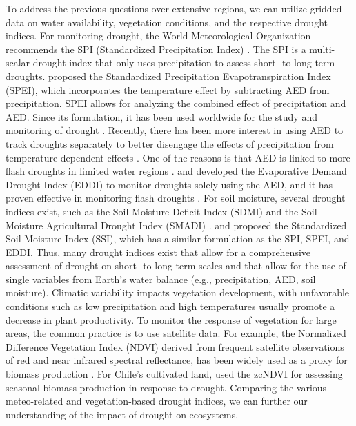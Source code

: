 \documentclass[
  authoryear,
  preprint,
  3p,
  onecolumn]{elsarticle}
\begin{document}
To address the previous questions over extensive regions, we can utilize
gridded data on water availability, vegetation conditions, and the
respective drought indices. For monitoring drought, the World
Meteorological Organization recommends the SPI (Standardized
Precipitation Index) \citep{WMO2012}. The SPI is a multi-scalar drought
index that only uses precipitation to assess short- to long-term
droughts. \citet{Vicente-Serrano2010} proposed the Standardized
Precipitation Evapotranspiration Index (SPEI), which incorporates the
temperature effect by subtracting AED from precipitation. SPEI allows
for analyzing the combined effect of precipitation and AED. Since its
formulation, it has been used worldwide for the study and monitoring of
drought \citep{Gebrechorkos2023, Liu2024}. Recently, there has been more
interest in using AED to track droughts separately to better disengage
the effects of precipitation from temperature-dependent effects
\citep{Vicente-Serrano2020}. One of the reasons is that AED is linked to
more flash droughts in limited water regions \citep{Noguera2022}.
\citet{Hobbins2016} and \citet{McEvoy2016} developed the Evaporative
Demand Drought Index (EDDI) to monitor droughts solely using the AED,
and it has proven effective in monitoring flash droughts
\citep{Li2024, Ford2023}. For soil moisture, several drought indices
exist, such as the Soil Moisture Deficit Index (SDMI)
\citep{Narasimhan2005} and the Soil Moisture Agricultural Drought Index
(SMADI) \citep{Souza2021}. \citet{Hao2013} and \citet{AghaKouchak2014}
proposed the Standardized Soil Moisture Index (SSI), which has a similar
formulation as the SPI, SPEI, and EDDI. Thus, many drought indices exist
that allow for a comprehensive assessment of drought on short- to
long-term scales and that allow for the use of single variables from
Earth's water balance (e.g., precipitation, AED, soil moisture).
Climatic variability impacts vegetation development, with unfavorable
conditions such as low precipitation and high temperatures usually
promote a decrease in plant productivity. To monitor the response of
vegetation for large areas, the common practice is to use satellite
data. For example, the Normalized Difference Vegetation Index (NDVI)
derived from frequent satellite observations of red and near infrared
spectral reflectance, has been widely used as a proxy for biomass
production \citep{Camps-Valls2021, Paruelo2016, Helman2014}. For Chile's
cultivated land, \citet{Zambrano2018} used the zcNDVI for assessing
seasonal biomass production in response to drought. Comparing the
various meteo-related and vegetation-based drought indices, we can
further our understanding of the impact of drought on ecosystems.
\end{document}
